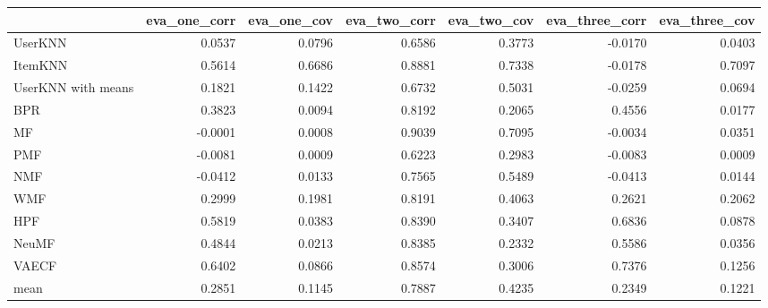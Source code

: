 \begin{tabular}{lrrrrrr}
\toprule
{} &  eva\_one\_corr &  eva\_one\_cov &  eva\_two\_corr &  eva\_two\_cov &  eva\_three\_corr &  eva\_three\_cov \\
\midrule
UserKNN            &        0.0537 &       0.0796 &        0.6586 &       0.3773 &         -0.0170 &         0.0403 \\
ItemKNN            &        0.5614 &       0.6686 &        0.8881 &       0.7338 &         -0.0178 &         0.7097 \\
UserKNN with means &        0.1821 &       0.1422 &        0.6732 &       0.5031 &         -0.0259 &         0.0694 \\
BPR                &        0.3823 &       0.0094 &        0.8192 &       0.2065 &          0.4556 &         0.0177 \\
MF                 &       -0.0001 &       0.0008 &        0.9039 &       0.7095 &         -0.0034 &         0.0351 \\
PMF                &       -0.0081 &       0.0009 &        0.6223 &       0.2983 &         -0.0083 &         0.0009 \\
NMF                &       -0.0412 &       0.0133 &        0.7565 &       0.5489 &         -0.0413 &         0.0144 \\
WMF                &        0.2999 &       0.1981 &        0.8191 &       0.4063 &          0.2621 &         0.2062 \\
HPF                &        0.5819 &       0.0383 &        0.8390 &       0.3407 &          0.6836 &         0.0878 \\
NeuMF              &        0.4844 &       0.0213 &        0.8385 &       0.2332 &          0.5586 &         0.0356 \\
VAECF              &        0.6402 &       0.0866 &        0.8574 &       0.3006 &          0.7376 &         0.1256 \\
mean               &        0.2851 &       0.1145 &        0.7887 &       0.4235 &          0.2349 &         0.1221 \\
\bottomrule
\end{tabular}
